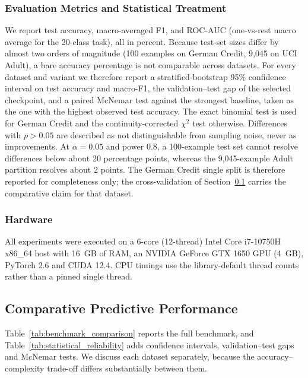 \subsubsection{Evaluation Metrics and Statistical Treatment}
We report test accuracy, macro-averaged F1, and ROC-AUC (one-vs-rest macro
average for the 20-class task), all in percent. Because test-set sizes differ by
almost two orders of magnitude (100 examples on German Credit, 9{,}045 on UCI
Adult), a bare accuracy percentage is not comparable across datasets. For every
dataset and variant we therefore report a stratified-bootstrap 95\% confidence
interval on test accuracy and macro-F1, the validation--test gap of the selected
checkpoint, and a paired McNemar test against the strongest baseline, taken as the
one with the highest observed test accuracy. The exact binomial test is used for
German Credit and the continuity-corrected $\chi^2$ test otherwise. Differences
with $p > 0.05$ are described as not distinguishable from sampling noise, never as
improvements. At $\alpha = 0.05$ and power $0.8$, a 100-example test set cannot
resolve differences below about 20 percentage points, whereas the 9{,}045-example
Adult partition resolves about 2 points. The German Credit single split is
therefore reported for completeness only; the cross-validation of
Section~\ref{subsec:comparative_results} carries the comparative claim for that
dataset.

\subsubsection{Hardware}
All experiments were executed on a 6-core (12-thread) Intel Core i7-10750H
x86\_64 host with 16~GB of RAM, an NVIDIA GeForce GTX 1650 GPU (4~GB), PyTorch
2.6 and CUDA 12.4. CPU timings use the library-default thread counts rather than
a pinned single thread.

\subsection{Comparative Predictive Performance}
\label{subsec:comparative_results}

Table~\ref{tab:benchmark_comparison} reports the full benchmark, and
Table~\ref{tab:statistical_reliability} adds confidence intervals, validation--test
gaps and McNemar tests. We discuss each dataset separately, because the
accuracy--complexity trade-off differs substantially between them.



